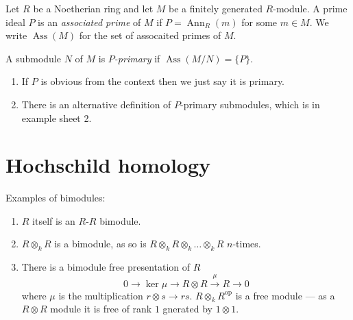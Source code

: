 \documentclass[a4paper]{article}
\DeclareMathOperator{\Ann}{Ann} %
\DeclareMathOperator{\Ass}{Ass} %
\begin{document}
\begin{definition}
  Let \(R\) be a Noetherian ring and let \(M\) be a finitely generated \(R\)-module. A prime ideal \(P\) is an \emph{associated prime} of \(M\) if \(P = \Ann_R(m)\) for some \(m \in M\). We write \(\Ass(M)\) for the set of assocaited primes of \(M\).
\end{definition}

\begin{definition}
  A submodule \(N\) of \(M\) is \emph{\(P\)-primary} if \(\Ass(M/N) = \{P\}\).
\end{definition}

\begin{remark}\leavevmode
  \begin{enumerate}
  \item If \(P\) is obvious from the context then we just say it is primary.
  \item There is an alternative definition of \(P\)-primary submodules, which is in example sheet 2.
  \end{enumerate}
\end{remark}




















\iffalse
\section{Hochschild homology}

\begin{eg}
  Examples of bimodules:
  \begin{enumerate}
  \item \(R\) itself is an \(R\)-\(R\) bimodule.
  \item \(R \otimes_k R\) is a bimodule, as so is \(R \otimes_k R \otimes_k \dots \otimes_k R\) \(n\)-times.
  \item There is a bimodule free presentation of \(R\)
    \[
      0 \to \ker \mu \to R \otimes R \xrightarrow{\mu} R \to 0
    \]
    where \(\mu\) is the multiplication \(r \otimes s \to rs\). \(R \otimes_k R^{\text{op}}\) is a free module --- as a \(R \otimes R\) module it is free of rank \(1\) gnerated by \(1 \otimes 1\).
  \end{enumerate}
\end{eg}
\end{document}
